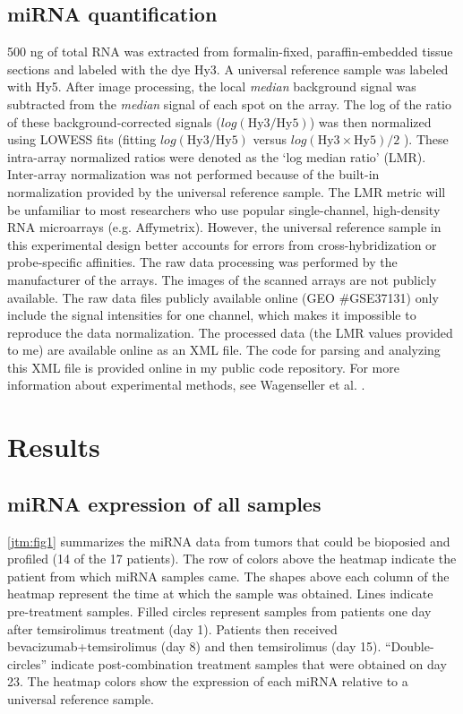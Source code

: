 \subsection{miRNA quantification}
500 ng of total RNA was extracted from formalin-fixed, paraffin-embedded
tissue sections and labeled with the dye Hy3. A universal reference sample was labeled with
Hy5. After image processing, the local \textit{median} background 
signal was subtracted from the \textit{median} signal 
of each spot on the array. The log of the ratio of these background-corrected signals
($log(\text{Hy3}/\text{Hy5})$) was then
normalized using LOWESS fits (fitting $log(\text{Hy3}/\text{Hy5})$ versus  
$log(\text{Hy3} \times \text{Hy5}) / 2$ ).
These intra-array normalized ratios were denoted as the `log median ratio' (LMR).
Inter-array normalization was not performed because of the built-in normalization provided
by the universal reference sample.
The LMR metric will be unfamiliar to most researchers who use 
popular single-channel, high-density RNA microarrays (e.g. Affymetrix).
However, the universal reference sample in this experimental
design better accounts for errors from cross-hybridization or
probe-specific affinities. The raw data processing was performed by the manufacturer of the
arrays. The images of the scanned arrays are not publicly available.
The raw data files publicly available online (GEO \#GSE37131) only include
the signal intensities for one channel, which makes it impossible to reproduce
the data normalization. The processed data (the LMR values provided to me) are available
online as an XML file. The code for parsing and analyzing this XML file is provided online
in my public code repository. For more information about experimental methods, see
Wagenseller et al. \cite{Wagenseller:2013fj}.



\section{Results}

\subsection{miRNA expression of all samples}

\autoref{jtm:fig1} summarizes the miRNA data from tumors that could be bioposied and profiled
(14 of the 17 patients). The row of colors above the heatmap indicate the patient
from which miRNA samples came. The shapes above each column of the heatmap represent the time
at which the sample was obtained. Lines indicate pre-treatment samples. Filled circles represent
samples from patients one day after temsirolimus treatment (day 1). Patients then received
bevacizumab+temsirolimus (day 8) and then temsirolimus (day 15). ``Double-circles'' indicate
post-combination treatment samples
that were obtained on day 23. The heatmap colors show the expression of each miRNA relative to
a universal reference sample.

